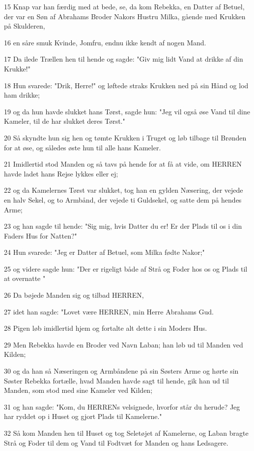 \par 15 Knap var han færdig med at bede, se, da kom Rebekka, en Datter af Betuel, der var en Søn af Abrahams Broder Nakors Hustru Milka, gående med Krukken på Skulderen,
\par 16 en såre smuk Kvinde, Jomfru, endnu ikke kendt af nogen Mand.
\par 17 Da ilede Trællen hen til hende og sagde: "Giv mig lidt Vand at drikke af din Krukke!"
\par 18 Hun svarede: "Drik, Herre!" og løftede straks Krukken ned på sin Hånd og lod ham drikke;
\par 19 og da hun havde slukket hans Tørst, sagde hun: "Jeg vil også øse Vand til dine Kameler, til de har slukket deres Tørst."
\par 20 Så skyndte hun sig hen og tømte Krukken i Truget og løb tilbage til Brønden for at øse, og således øste hun til alle hans Kameler.
\par 21 Imidlertid stod Manden og så tavs på hende for at få at vide, om HERREN havde ladet hans Rejse lykkes eller ej;
\par 22 og da Kamelernes Tørst var slukket, tog han en gylden Næsering, der vejede en halv Sekel, og to Armbånd, der vejede ti Guldsekel, og satte dem på hendes Arme;
\par 23 og han sagde til hende: "Sig mig, hvis Datter du er! Er der Plads til os i din Faders Hus for Natten?"
\par 24 Hun svarede: "Jeg er Datter af Betuel, som Milka fødte Nakor;"
\par 25 og videre sagde hun: "Der er rigeligt både af Strå og Foder hos os og Plads til at overnatte "
\par 26 Da bøjede Manden sig og tilbad HERREN,
\par 27 idet han sagde: "Lovet være HERREN, min Herre Abrahams Gud.
\par 28 Pigen løb imidlertid hjem og fortalte alt dette i sin Moders Hus.
\par 29 Men Rebekka havde en Broder ved Navn Laban; han løb ud til Manden ved Kilden;
\par 30 og da han så Næseringen og Armbåndene på sin Søsters Arme og hørte sin Søster Rebekka fortælle, hvad Manden havde sagt til hende, gik han ud til Manden, som stod med sine Kameler ved Kilden;
\par 31 og han sagde: "Kom, du HERRENs velsignede, hvorfor står du herude? Jeg har ryddet op i Huset og gjort Plads til Kamelerne."
\par 32 Så kom Manden hen til Huset og tog Seletøjet af Kamelerne, og Laban bragte Strå og Foder til dem og Vand til Fodtvæt for Manden og hans Ledsagere.
